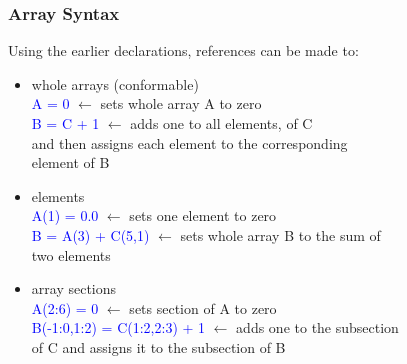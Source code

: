 \documentclass[11pt]{beamer}
\begin{document}
\begin{frame}[fragile]
\frametitle{Array Syntax}

Using the earlier declarations, references can be made to:

\begin{itemize}
\item whole arrays (conformable)\\
\quad \textcolor{blue}{A = 0} $\leftarrow$ sets whole array A to zero \\
\quad \textcolor{blue}{B = C + 1} $\leftarrow$ adds one to all elements, of C \\
\quad \quad \quad and then assigns each element to the corresponding \\
\quad \quad \quad element of B \\

\item elements \\
\quad \textcolor{blue}{A(1) = 0.0} $\leftarrow$ sets one element to zero \\
\quad \textcolor{blue}{B = A(3) + C(5,1)} $\leftarrow$ sets whole array B to the sum of \\
\quad \quad \quad two elements\\

\item array sections \\
\quad \textcolor{blue}{A(2:6) = 0} $\leftarrow$ sets section of A to zero \\
\quad \textcolor{blue}{B(-1:0,1:2) = C(1:2,2:3) + 1} $\leftarrow$  adds one to the subsection \\
\quad \quad \quad of C and assigns it to the subsection of B \\
 \end{itemize}
 
\end{frame}

\end{document}
